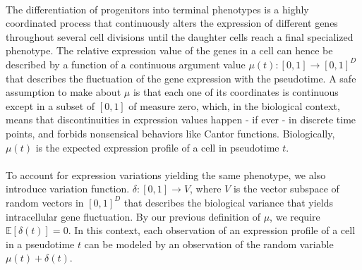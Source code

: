 \documentclass[11pt]{article}
\begin{document}
\\
The differentiation of progenitors into terminal phenotypes is a highly coordinated process that continuously alters the expression of different genes throughout several cell divisions until the daughter cells reach a final specialized phenotype. The relative expression value of the genes in a cell can hence be described by a function of a continuous argument value $\mu (t): [0,1] \to [0,1]^D$ that describes the fluctuation of the gene expression with the pseudotime. A safe assumption to make about $\mu$ is that each one of its coordinates is continuous except in a subset of $[0,1]$ of measure zero, which, in the biological context, means that discontinuities in expression values happen - if ever - in discrete time points, and forbids nonsensical behaviors like Cantor functions. Biologically, $\mu(t)$ is the expected expression profile of a cell in pseudotime $t$.\\
\\
To account for expression variations yielding the same phenotype, we also introduce variation function. $\delta : [0,1] \to V$, where $V$ is the vector subspace of random vectors in $[0,1]^D$ that describes the biological variance that yields intracellular gene fluctuation. By our previous definition of $\mu$, we require $\mathbb{E}[\delta(t)] = 0$. In this context, each observation of an expression profile of a cell in a pseudotime $t$ can be modeled by an observation of the random variable $\mu(t) + \delta(t)$. 


\end{document}
